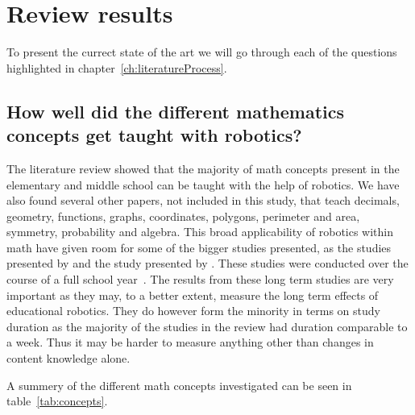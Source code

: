 \section{Review results}\label{ch:stateOfArt}
To present the currect state of the art we will go through each of the questions highlighted in chapter~\ref{ch:literatureProcess}.

\subsection*{How well did the different mathematics concepts get taught with robotics?}
The literature review showed that the majority of math concepts present in the elementary and middle school can be taught with the help of robotics. We have also found several other papers, not included in this study, that teach decimals, geometry, functions, graphs, coordinates, polygons, perimeter and area, symmetry, probability and algebra.
This broad applicability of robotics within math have given room for some of the bigger studies presented, as the studies presented by \citeauthor{hussain2006effect} and the study presented by \citeauthor{lindh2007does}. These studies were conducted over the course of a full school year~\cite{hussain2006effect,lindh2007does}. 
The results from these long term studies are very important as they may, to a better extent, measure the long term effects of educational robotics. 
They do however form the minority in terms on study duration as the majority of the studies in the review had duration comparable to a week. 
Thus it may be harder to measure anything other than changes in content knowledge alone.

\bigskip\noindent
A summery of the different math concepts investigated can be seen in table~\ref{tab:concepts}. 

